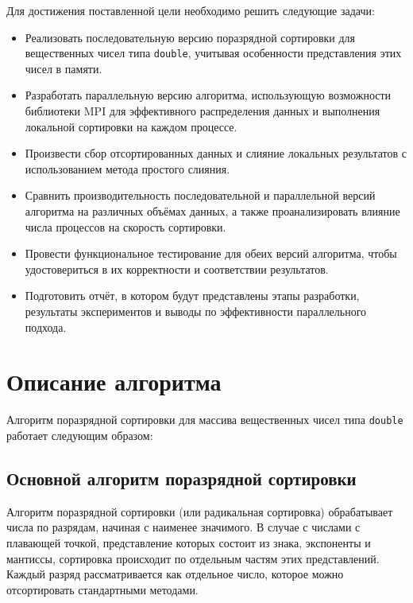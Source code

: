\documentclass[12pt]{article}
\begin{document}
Для достижения поставленной цели необходимо решить следующие задачи: \begin{itemize} 
    \item Реализовать последовательную версию поразрядной сортировки для вещественных чисел типа \texttt{double}, учитывая особенности представления этих чисел в памяти. 
    \item Разработать параллельную версию алгоритма, использующую возможности библиотеки MPI для эффективного распределения данных и выполнения локальной сортировки на каждом процессе. 
    \item Произвести сбор отсортированных данных и слияние локальных результатов с использованием метода простого слияния. 
    \item Сравнить производительность последовательной и параллельной версий алгоритма на различных объёмах данных, а также проанализировать влияние числа процессов на скорость сортировки. 
    \item Провести функциональное тестирование для обеих версий алгоритма, чтобы удостовериться в их корректности и соответствии результатов. 
    \item Подготовить отчёт, в котором будут представлены этапы разработки, результаты экспериментов и выводы по эффективности параллельного подхода. \end{itemize}

\newpage

\section*{Описание алгоритма} 

\hspace*{1.25em}Алгоритм поразрядной сортировки для массива вещественных чисел типа \texttt{double} работает следующим образом:

\subsection*{Основной алгоритм поразрядной сортировки} Алгоритм поразрядной сортировки (или радикальная сортировка) обрабатывает числа по разрядам, начиная с наименее значимого. В случае с числами с плавающей точкой, представление которых состоит из знака, экспоненты и мантиссы, сортировка происходит по отдельным частям этих представлений. Каждый разряд рассматривается как отдельное число, которое можно отсортировать стандартными методами.
\end{document}
